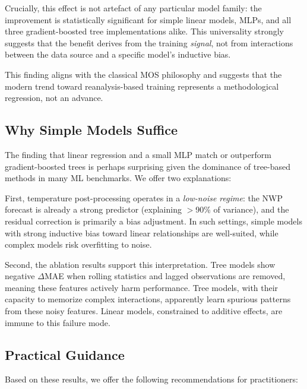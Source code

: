 \documentclass{ametsocV6.1}
\begin{document}
Crucially, this effect is not artefact of any particular model family: the
improvement is statistically significant for simple linear models, MLPs, and all
three gradient-boosted tree implementations alike. This universality strongly
suggests that the benefit derives from the training \emph{signal}, not from
interactions between the data source and a specific model's inductive bias.

This finding aligns with the classical MOS philosophy \citep{glahn1972mos} and
suggests that the modern trend toward reanalysis-based training represents a
methodological regression, not an advance.

\subsection{Why Simple Models Suffice}

The finding that linear regression and a small MLP match or outperform
gradient-boosted trees is perhaps surprising given the dominance of tree-based
methods in many ML benchmarks. We offer two explanations:

First, temperature post-processing operates in a \emph{low-noise regime}: the
NWP forecast is already a strong predictor (explaining $>$90\% of variance), and
the residual correction is primarily a bias adjustment. In such settings, simple
models with strong inductive bias toward linear relationships are well-suited,
while complex models risk overfitting to noise.

Second, the ablation results support this interpretation. Tree models show negative
$\Delta$MAE when rolling statistics and lagged observations are removed, meaning
these features actively harm performance. Tree models, with their capacity to
memorize complex interactions, apparently learn spurious patterns from these noisy
features. Linear models, constrained to additive effects, are immune to this
failure mode.

\subsection{Practical Guidance}

Based on these results, we offer the following recommendations for practitioners:
\end{document}
